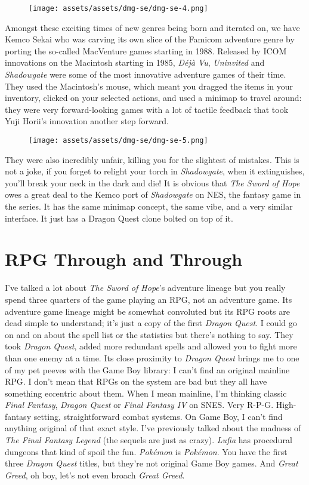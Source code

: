 \documentclass{book}
\begin{document}
\begin{figure}[hbt]
\vskip 10pt
\centering \texttt{[image: assets/assets/dmg-se/dmg-se-4.png]}
\vskip 6pt
\end{figure}
Amongst these exciting times of new genres being born and iterated on, we have Kemco Sekai who was carving its own slice of the Famicom adventure genre by porting the so-called MacVenture games starting in 1988. Released by ICOM innovations on the Macintosh starting in 1985, \emph{Déjà Vu}, \emph{Uninvited} and \emph{Shadowgate} were some of the most innovative adventure games of their time. They used the Macintosh’s mouse, which meant you dragged the items in your inventory, clicked on your selected actions, and used a minimap to travel around: they were very forward-looking games with a lot of tactile feedback that took Yuji Horii’s innovation another step forward.

\begin{figure}[hbt]
\vskip 10pt
\centering \texttt{[image: assets/assets/dmg-se/dmg-se-5.png]}
\vskip 6pt
\end{figure}
They were also incredibly unfair, killing you for the slightest of mistakes. This is not a joke, if you forget to relight your torch in \emph{Shadowgate}, when it extinguishes, you’ll break your neck in the dark and die! It is obvious that \emph{The Sword of Hope} owes a great deal to the Kemco port of \emph{Shadowgate} on NES, the fantasy game in the series. It has the same minimap concept, the same vibe, and a very similar interface. It just has a Dragon Quest clone bolted on top of it.

\FloatBarrier\needspace{10mm}\section*{RPG Through and Through}\nopagebreak[4]

I’ve talked a lot about \emph{The Sword of Hope}’s adventure lineage but you really spend three quarters of the game playing an RPG, not an adventure game. Its adventure game lineage might be somewhat convoluted but its RPG roots are dead simple to understand; it’s just a copy of the first \emph{Dragon Quest}. I could go on and on about the spell list or the statistics but there’s nothing to say. They took \emph{Dragon Quest}, added more redundant spells and allowed you to fight more than one enemy at a time. Its close proximity to \emph{Dragon Quest} brings me to one of my pet peeves with the Game Boy library: I can’t find an original mainline RPG. I don’t mean that RPGs on the system are bad but they all have something eccentric about them. When I mean mainline, I’m thinking classic \emph{Final Fantasy}, \emph{Dragon Quest} or \emph{Final Fantasy IV} on SNES. Very R-P-G. High-fantasy setting, straightforward combat systems. On Game Boy, I can’t find anything original of that exact style. I’ve previously talked about the madness of \emph{The Final Fantasy Legend} (the sequels are just as crazy). \emph{Lufia} has procedural dungeons that kind of spoil the fun. \emph{Pokémon} is \emph{Pokémon}. You have the first three \emph{Dragon Quest} titles, but they’re not original Game Boy games. And \emph{Great Greed}, oh boy, let’s not even broach \emph{Great Greed}.
\end{document}
